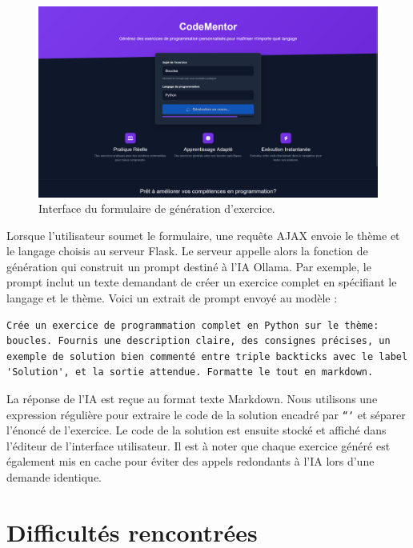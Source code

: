 \documentclass[a4paper, 12pt, twoside]{article}
\begin{document}
\begin{figure}[h!]
\centering
\includegraphics[width=1.2\textwidth]{formulaire.png}
\caption{Interface du formulaire de génération d'exercice.}
\label{fig:formulaire}
\end{figure}

Lorsque l'utilisateur soumet le formulaire, une requête AJAX envoie le thème et le langage choisis au serveur Flask. Le serveur appelle alors la fonction de génération qui construit un prompt destiné à l'IA Ollama. Par exemple, le prompt inclut un texte demandant de créer un exercice complet en spécifiant le langage et le thème. Voici un extrait de prompt envoyé au modèle : 

\begin{verbatim}
Crée un exercice de programmation complet en Python sur le thème: boucles. Fournis une description claire, des consignes précises, un exemple de solution bien commenté entre triple backticks avec le label 'Solution', et la sortie attendue. Formatte le tout en markdown.
\end{verbatim}

La réponse de l'IA est reçue au format texte Markdown. Nous utilisons une expression régulière pour extraire le code de la solution encadré par \texttt{```} et séparer l'énoncé de l'exercice. Le code de la solution est ensuite stocké et affiché dans l'éditeur de l'interface utilisateur. Il est à noter que chaque exercice généré est également mis en cache pour éviter des appels redondants à l'IA lors d'une demande identique.

\section{Difficultés rencontrées}
\end{document}
